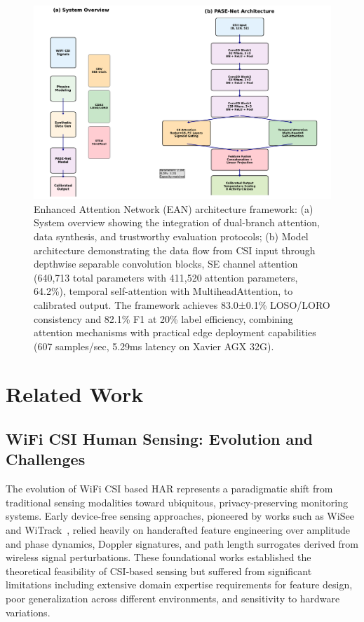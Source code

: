 \documentclass[lettersize,journal]{IEEEtran}
\begin{document}
\begin{figure}[t]
\centering
\includegraphics[width=\linewidth]{plots/fig1_system_architecture_v3.pdf}
\caption{Enhanced Attention Network (EAN) architecture framework: (a) System overview showing the integration of dual-branch attention, data synthesis, and trustworthy evaluation protocols; (b) Model architecture demonstrating the data flow from CSI input through depthwise separable convolution blocks, SE channel attention (640,713 total parameters with 411,520 attention parameters, 64.2\%), temporal self-attention with MultiheadAttention, to calibrated output. The framework achieves 83.0±0.1\% LOSO/LORO consistency and 82.1\% F1 at 20\% label efficiency, combining attention mechanisms with practical edge deployment capabilities (607 samples/sec, 5.29ms latency on Xavier AGX 32G).}
\label{fig:system_architecture}
\end{figure}

\section{Related Work}

\subsection{WiFi CSI Human Sensing: Evolution and Challenges}

The evolution of WiFi CSI based HAR represents a paradigmatic shift from traditional sensing modalities toward ubiquitous, privacy-preserving monitoring systems. Early device-free sensing approaches, pioneered by works such as WiSee~\cite{pu2013whole} and WiTrack~\cite{adib2013see}, relied heavily on handcrafted feature engineering over amplitude and phase dynamics, Doppler signatures, and path length surrogates derived from wireless signal perturbations. These foundational works established the theoretical feasibility of CSI-based sensing but suffered from significant limitations including extensive domain expertise requirements for feature design, poor generalization across different environments, and sensitivity to hardware variations.
\end{document}
